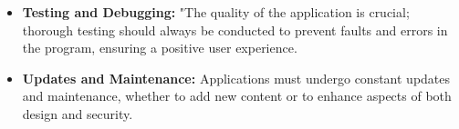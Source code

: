 \documentclass{article}
\begin{document}
\begin{itemize}
    \item \textbf{Testing and Debugging:} "The quality of the application is crucial; thorough testing should always be conducted to prevent faults and errors in the program, ensuring a positive user experience.
    
    \item \textbf{Updates and Maintenance:} Applications must undergo constant updates and maintenance, whether to add new content or to enhance aspects of both design and security.
\end{itemize}
\end{document}
